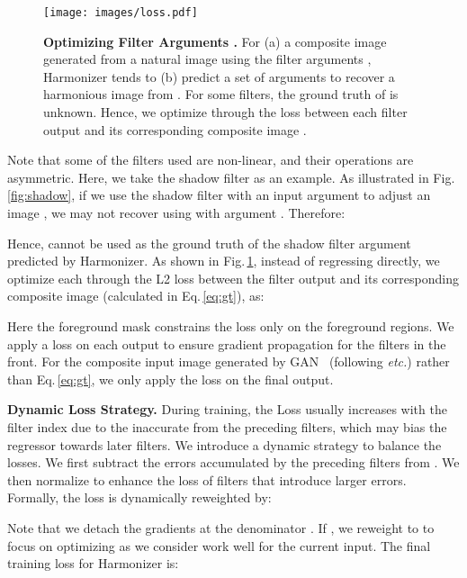 \documentclass[runningheads]{llncs}
\newcommand{\ke}[1]{{\color{black}#1}}
\begin{document}
 \begin{figure}[t]
\centering
\texttt{[image: images/loss.pdf]}
{\begin{center}
\vspace{-0.5cm}
\caption{\textbf{Optimizing Filter Arguments .} For (a) a composite image  generated from a natural image  using the filter arguments , Harmonizer tends to (b) predict a set of arguments  to recover a harmonious image  from . For some filters, the ground truth of  is unknown. Hence, we optimize  through the loss  between each filter output  and its corresponding composite image .}
\label{fig:loss}
\end{center}
}
\vspace{-0.7cm}
\end{figure}

Note that some of the filters used are non-linear, and their operations are asymmetric. Here, we take the shadow filter  as an example. As illustrated in Fig.\,\ref{fig:shadow}, if we use the shadow filter  with an input argument  to adjust an image , we may not recover  using  with argument . Therefore:

Hence,  cannot be used as the ground truth of the shadow filter argument  predicted by Harmonizer. As shown in Fig.\,\ref{fig:loss}, instead of regressing  directly, we optimize each  through the L2 loss between the filter output  and its corresponding composite image  (calculated in Eq.\,\ref{eq:gt}), as:

Here the foreground mask  constrains the loss only on the foreground regions. 
We apply a loss on each output to ensure gradient propagation for the filters in the front. 
For the composite input image generated by GAN~\cite{GAN} (following \cite{DoveNet,BargainNet,TransformerIH} {\it etc.}) rather than Eq.\,\ref{eq:gt}, we only apply the loss  on the final output.


\textbf{Dynamic Loss Strategy.} During training, the Loss  usually increases with the filter index  due to the inaccurate  from the preceding filters, which may bias the regressor towards later filters. We introduce a dynamic strategy to balance the losses. We first subtract the errors accumulated by the preceding filters from . We then normalize  to enhance the loss of filters that introduce larger errors. Formally, the loss  is dynamically reweighted by:

\ke{Note that we detach the gradients at the denominator . If , we reweight  to  to focus on optimizing  as we consider  work well for the current input.}
The final training loss for Harmonizer is:
\end{document}
